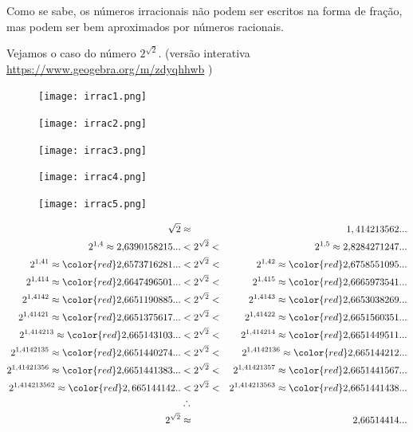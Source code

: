 Como se sabe, os números irracionais não podem ser escritos na forma de fração, mas podem ser bem aproximados por números racionais.

Vejamos o caso do número $2^{\sqrt{2}}$. (versão interativa \url{https://www.geogebra.org/m/zdyqhhwb} )

\begin{figure}[H]
\centering
\texttt{[image: irrac1.png]}
\end{figure}

\begin{figure}[H]
\centering
\texttt{[image: irrac2.png]}
\end{figure}

\begin{figure}[H]
\centering
\texttt{[image: irrac3.png]}
\end{figure}

\begin{figure}[H]
\centering
\texttt{[image: irrac4.png]}
\end{figure}

\begin{figure}[H]
\centering
\texttt{[image: irrac5.png]}
\end{figure}

\begin{eqnarray*}
{\sqrt{2}}&\approx& 1,414213562...\\
2^{1{,}4}\approx 2{,}6390158215...& <2^{\sqrt{2}} < & 2^{1{,}5}\approx 2{,}8284271247...\\
2^{1{,}41}\approx {\color{red} 2{,}6}573716281... & < 2^{\sqrt{2}} < & 2^{1{,}42}\approx {\color{red} 2{,}6}758551095...\\
2^{1{,}414}\approx {\color{red} 2{,}66}47496501...&<2^{\sqrt{2}} < & 2^{1{,}415}\approx {\color{red} 2{,}66}65973541...\\
2^{1{,}4142}\approx {\color{red} 2{,}665}1190885...&<2^{\sqrt{2}} <& 2^{1{,}4143}\approx {\color{red} 2{,}665}3038269...\\
2^{1{,}41421}\approx {\color{red} 2{,}6651}375617...&<2^{\sqrt{2}} <& 2^{1{,}41422}\approx {\color{red} 2{,}6651}560351...\\
2^{1{,}414213}\approx {\color{red} 2{,}66514}3103...&<2^{\sqrt{2}} <& 2^{1{,}414214}\approx {\color{red} 2{,}66514}49511...\\
2^{1{,}4142135}\approx {\color{red} 2{,}665144}0274...&<2^{\sqrt{2}} <& 2^{1{,}4142136}\approx {\color{red} 2{,}665144}212...\\
2^{1{,}41421356}\approx {\color{red} 2{,}6651441}383... &<2^{\sqrt{2}} <& 2^{1{,}41421357}\approx {\color{red} 2{,}6651441}567... \\
2^{1{,}414213562}\approx {\color{red} 2,66514414}2.. &<2^{\sqrt{2}} <& 2^{1{,}414213563}\approx {\color{red} 2{,}66514414}38...\\
&\therefore& \\
2^{\sqrt{2}}&\approx& 2{,}66514414...\\
\end{eqnarray*}


